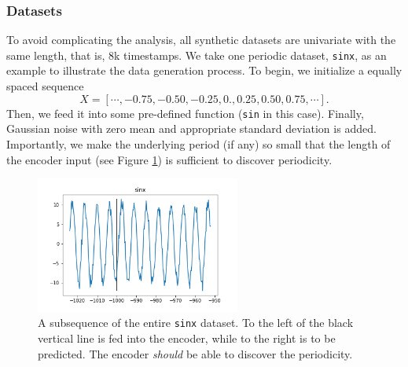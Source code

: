 \subsubsection{Datasets}
To avoid complicating the analysis, all synthetic datasets are univariate with the same length, that is, 8k timestamps. 
We take one periodic dataset, \texttt{sinx}, as an example to illustrate the data generation process. 
To begin, we initialize a equally spaced sequence $$X = [\cdots, -0.75, -0.50, -0.25, 0., 0.25, 0.50, 0.75, \cdots].$$
Then, we feed it into some pre-defined function (\texttt{sin} in this case). 
Finally, Gaussian noise with zero mean and appropriate standard deviation is added. 
Importantly, we make the underlying period (if any) so small that the length of the encoder input (see Figure \ref{fig:sinx}) is sufficient to discover periodicity. 

\begin{figure}
    \centering
    \includegraphics[width=0.6\textwidth]{img/data_sinx.png}
    \caption{A subsequence of the entire \texttt{sinx} dataset. 
    To the left of the black vertical line is fed into the encoder, while to the right is to be predicted. 
    The encoder \textit{should} be able to discover the periodicity.}
    \label{fig:sinx}
\end{figure}

